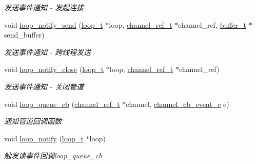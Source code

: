 \begin{DoxyCompactItemize}
\begin{DoxyCompactList}\small\item\em 发送事件通知 -\/ 发起连接 \end{DoxyCompactList}\item 
void \hyperlink{a00069_ad023112870f736a601137129420a94b9_ad023112870f736a601137129420a94b9}{loop\+\_\+notify\+\_\+send} (\hyperlink{a00051_a9c3ad1cd2de83e09f3a7b59fa82c94ee_a9c3ad1cd2de83e09f3a7b59fa82c94ee}{loop\+\_\+t} $\ast$loop, \hyperlink{a00051_a151271c9d188ef28d4d24bb81dcc1263_a151271c9d188ef28d4d24bb81dcc1263}{channel\+\_\+ref\+\_\+t} $\ast$channel\+\_\+ref, \hyperlink{a00051_aad99a77d28bd81d3d36d0ea569c9482d_aad99a77d28bd81d3d36d0ea569c9482d}{buffer\+\_\+t} $\ast$send\+\_\+buffer)
\begin{DoxyCompactList}\small\item\em 发送事件通知 -\/ 跨线程发送 \end{DoxyCompactList}\item 
void \hyperlink{a00069_a6c9f3ec8e93c6e7b10ebb4dcaca562d4_a6c9f3ec8e93c6e7b10ebb4dcaca562d4}{loop\+\_\+notify\+\_\+close} (\hyperlink{a00051_a9c3ad1cd2de83e09f3a7b59fa82c94ee_a9c3ad1cd2de83e09f3a7b59fa82c94ee}{loop\+\_\+t} $\ast$loop, \hyperlink{a00051_a151271c9d188ef28d4d24bb81dcc1263_a151271c9d188ef28d4d24bb81dcc1263}{channel\+\_\+ref\+\_\+t} $\ast$channel\+\_\+ref)
\begin{DoxyCompactList}\small\item\em 发送事件通知 -\/ 关闭管道 \end{DoxyCompactList}\item 
void \hyperlink{a00069_a970d2bf2e65270fe3d93de1e22a4d34c_a970d2bf2e65270fe3d93de1e22a4d34c}{loop\+\_\+queue\+\_\+cb} (\hyperlink{a00051_a151271c9d188ef28d4d24bb81dcc1263_a151271c9d188ef28d4d24bb81dcc1263}{channel\+\_\+ref\+\_\+t} $\ast$channel, \hyperlink{a00051_aaf2cba5d4035f3d56350b59342ebf65c_aaf2cba5d4035f3d56350b59342ebf65c}{channel\+\_\+cb\+\_\+event\+\_\+e} e)
\begin{DoxyCompactList}\small\item\em 通知管道回调函数 \end{DoxyCompactList}\item 
void \hyperlink{a00069_a3857990b0f1f9e27e000b5924b88a958_a3857990b0f1f9e27e000b5924b88a958}{loop\+\_\+notify} (\hyperlink{a00051_a9c3ad1cd2de83e09f3a7b59fa82c94ee_a9c3ad1cd2de83e09f3a7b59fa82c94ee}{loop\+\_\+t} $\ast$loop)
\begin{DoxyCompactList}\small\item\em 触发读事件回调loop\+\_\+queue\+\_\+cb \end{DoxyCompactList}\item 

\end{DoxyCompactItemize}
